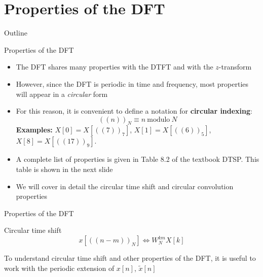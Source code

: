 \documentclass[10pt, aspectratio=169]{beamer}
\begin{document}
%
\section{Properties of the DFT}
\begin{frame}{Outline}
	\tableofcontents[currentsection]
\end{frame}
\begin{frame}{Properties of the DFT}
	\begin{itemize}
		\item The DFT shares many properties with the DTFT and with the $z$-transform
		\item However, since the DFT is periodic in time and frequency, most properties will appear in a \textit{circular} form
		\item For this reason, it is convenient to define a notation for \textbf{circular indexing}:
		\begin{equation*}
			((n))_N \equiv n~\text{modulo}~N
		\end{equation*}
		\textbf{Examples:} $X[0] = X[((7))_7]$, $X[1] = X[((6))_5]$, $X[8] = X[((17))_9]$.
		
		\item A complete list of properties is given in Table 8.2 of the textbook DTSP. This table is shown in the next slide
		\item We will cover in detail the circular time shift and circular convolution properties
	\end{itemize}
\end{frame}

%
\begin{frame}{Properties of the DFT}
	\centering
\end{frame}

%
\begin{frame}{Circular time shift}
\begin{equation*}
	x[((n-m))_N] \Longleftrightarrow W_N^{km}X[k] \tag{circular time shift}
\end{equation*}

To understand circular time shift and other properties of the DFT, it is useful to work with the periodic extension of $x[n]$, $\tilde{x}[n]$

\begin{center}
	\resizebox{0.8\textwidth}{!}{}
\end{center}
\end{frame}
\end{document}
